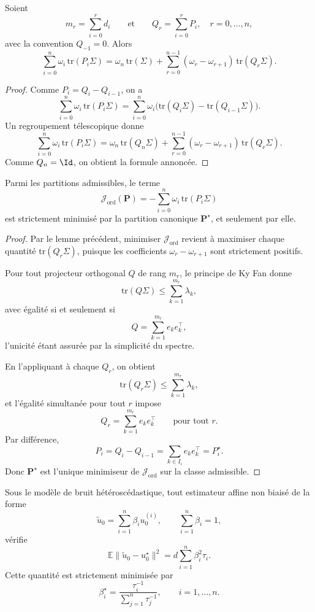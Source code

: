 \begin{lemma}
Soient
\[
m_r=\sum_{i=0}^r d_i
\qquad\text{et}\qquad
Q_r=\sum_{i=0}^r P_i,
\quad r=0,\dots,n,
\]
avec la convention \(Q_{-1}=0\).
Alors
\[
\sum_{i=0}^n \omega_i\,\mathrm{tr}(P_i\Sigma)
=
\omega_n\,\mathrm{tr}(\Sigma)
+
\sum_{r=0}^{n-1}(\omega_r-\omega_{r+1})\,\mathrm{tr}(Q_r\Sigma).
\]
\end{lemma}

\begin{proof}
Comme \(P_i=Q_i-Q_{i-1}\), on a
\[
\sum_{i=0}^n \omega_i\,\mathrm{tr}(P_i\Sigma)
=
\sum_{i=0}^n \omega_i\bigl(\mathrm{tr}(Q_i\Sigma)-\mathrm{tr}(Q_{i-1}\Sigma)\bigr).
\]
Un regroupement télescopique donne
\[
\sum_{i=0}^n \omega_i\,\mathrm{tr}(P_i\Sigma)
=
\omega_n\,\mathrm{tr}(Q_n\Sigma)
+
\sum_{r=0}^{n-1}(\omega_r-\omega_{r+1})\,\mathrm{tr}(Q_r\Sigma).
\]
Comme \(Q_n=\Id\), on obtient la formule annoncée.
\end{proof}

\begin{lemma}
Parmi les partitions admissibles, le terme
\[
\mathcal J_{\mathrm{ord}}(\mathbf P)
=
-\sum_{i=0}^n \omega_i\,\mathrm{tr}(P_i\Sigma)
\]
est strictement minimisé par la partition canonique \(\mathbf P^\star\), et seulement par elle.
\end{lemma}

\begin{proof}
Par le lemme précédent, minimiser \(\mathcal J_{\mathrm{ord}}\) revient à maximiser chaque quantité \(\mathrm{tr}(Q_r\Sigma)\), puisque les coefficients \(\omega_r-\omega_{r+1}\) sont strictement positifs.

Pour tout projecteur orthogonal \(Q\) de rang \(m_r\), le principe de Ky Fan donne
\[
\mathrm{tr}(Q\Sigma)\le \sum_{k=1}^{m_r}\lambda_k,
\]
avec égalité si et seulement si
\[
Q=\sum_{k=1}^{m_r} e_ke^\top_k,
\]
l'unicité étant assurée par la simplicité du spectre.

En l'appliquant à chaque \(Q_r\), on obtient
\[
\mathrm{tr}(Q_r\Sigma)\le \sum_{k=1}^{m_r}\lambda_k,
\]
et l'égalité simultanée pour tout \(r\) impose
\[
Q_r=\sum_{k=1}^{m_r} e_ke^\top_k
\qquad\text{pour tout } r.
\]
Par différence,
\[
P_i=Q_i-Q_{i-1}
=
\sum_{k\in I_i} e_ke^\top_k
=
P_i^\star.
\]
Donc \(\mathbf P^\star\) est l'unique minimiseur de \(\mathcal J_{\mathrm{ord}}\) sur la classe admissible.
\end{proof}

\begin{proposition}
Sous le modèle de bruit hétéroscédastique, tout estimateur affine non biaisé de la forme
\[
\tilde u_0=\sum_{i=1}^n \beta_i u_0^{(i)},
\qquad
\sum_{i=1}^n \beta_i=1,
\]
vérifie
\[
\mathbb E\|\tilde u_0-u_0^\star\|^2
=
d\sum_{i=1}^n \beta_i^2\tau_i.
\]
Cette quantité est strictement minimisée par
\[
\beta_i^\star
=
\frac{\tau_i^{-1}}{\sum_{j=1}^n\tau_j^{-1}},
\qquad i=1,\dots,n.
\]
\end{proposition}


